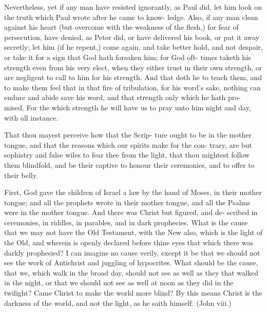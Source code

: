 \documentclass{custom}
\begin{document}
Nevertheless, yet if any man have resisted 
ignorantly, as Paul did, let him look on the 
truth which Paul wrote after he came to know- 
ledge. Also, if any man clean against his heart 
(but overcome with the weakness of the flesh,) 
for fear of persecution, have denied, as Peter 
did, or have delivered his book, or put it away 
secretly; let him (if he repent,) come again, and 
take better hold, and not despair, or take it for a 
sign that God hath forsaken him; for God oft- 
times taketh his strength even from his very elect, 
when they either trust in their own strength, or 
are negligent to call to him for his strength. And 
that doth he to teach them, and to make them 
feel that in that fire of tribulation, for his word's 
sake, nothing can endure and abide save his 
word, and that strength only which he hath pro- 
mised. For the which strength he will have us to 
pray unto him night and day, with all instance. 

That thou mayest perceive how that the Scrip- 
ture ought to be in the mother tongue, and that 
the reasons which our spirits make for the con- 
trary, are but sophistry and false wiles to fear 
thee from the light, that thou mightest follow 
them blindfold, and be their captive to honour 
their ceremonies, and to offer to their belly. 

First, God gave the children of Israel a law 
by the hand of Moses, in their mother tongue;
and all the prophets wrote in their mother 
tongue, and all the Psalms were in the mother 
tongue. And there was Christ but figured, and de- 
scribed in ceremonies, in riddles, in parables, and 
in dark prophecies. What is the cause that we 
may not have the Old Testament, with the New 
also, which is the light of the Old, and wherein 
is openly declared before thine eyes that which 
there was darkly prophesied? I can imagine no 
cause verily, except it be that we should not see 
the work of Antichrist and juggling of hypocrites. 
What should be the cause, that we, which walk 
in the broad day, should not see as well as they 
that walked in the night, or that we should not 
see as well at noon as they did in the twilight?
Came Christ to make the world more blind? By 
this means Christ is the darkness of the world, 
and not the light, as he saith himself. (John viii.)
\end{document}
